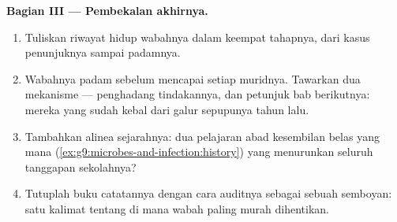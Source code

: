 \begin{problem}
\medskip\noindent\textbf{Bagian III --- Pembekalan akhirnya.}
\begin{enumerate}[resume]
  \item Tuliskan riwayat hidup wabahnya dalam keempat
        tahapnya, dari kasus penunjuknya sampai padamnya.
  \item Wabahnya padam sebelum mencapai setiap muridnya.
        Tawarkan dua mekanisme --- penghadang tindakannya,
        dan petunjuk bab berikutnya: mereka yang sudah kebal
        dari galur sepupunya tahun lalu.
  \item Tambahkan alinea sejarahnya: dua pelajaran abad
        kesembilan belas yang mana
        (\cref{ex:g9:microbes-and-infection:history}) yang
        menurunkan seluruh tanggapan sekolahnya?
  \item Tutuplah buku catatannya dengan cara auditnya sebagai
        sebuah semboyan: satu kalimat tentang di mana wabah
        paling murah dihentikan.
\end{enumerate}
\end{problem}
